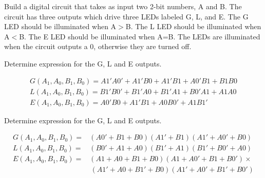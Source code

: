 \begin{enumerate}
        Build a digital circuit that takes as input two 2-bit numbers,
        A and B.  The circuit has three outputs which drive three
        LEDs labeled G, L, and E.
        The G LED should be illuminated when A$>$B.
        The L LED should be illuminated when A$<$B.
        The E LED should be illuminated when A=B.
        The LEDs are illuminated when the circuit outputs a 0, otherwise
        they are turned off.

        Determine \SOPmin expression for the G, L and E outputs.
        {\color{blue}
            \begin{onlysolution}
                \begin{gather*}
                    G(A_1, A_0, B_1, B_0) = A1'A0' + A1'B0 + A1'B1 + A0'B1 + B1B0\\
                    L(A_1, A_0, B_1, B_0) = B1'B0' + B1'A0 + B1'A1 + B0'A1 + A1A0\\
                    E(A_1, A_0, B_1, B_0) = A0'B0 + A1'B1 + A0B0' + A1B1'
                \end{gather*}
            \end{onlysolution}
            {\color{black}        Determine \POSmin expression for the G, L and E outputs.}
            \begin{onlysolution}
                \begin{align*}
                    G(A_1, A_0, B_1, B_0) =& (A0'+ B1+B0) (A1'+B1) (A1'+A0'+B0)\\
                    L(A_1, A_0, B_1, B_0) =& (B0'+ A1+A0) (B1'+A1) (B1'+B0'+A0)\\
                    E(A_1, A_0, B_1, B_0) =& (A1 + A0 + B1 + B0)(A1 + A0' + B1 + B0') \times\\
                    &\,(A1' + A0 + B1' + B0)(A1' + A0' + B1' + B0')
                \end{align*}
        \end{onlysolution}}
\end{enumerate}
